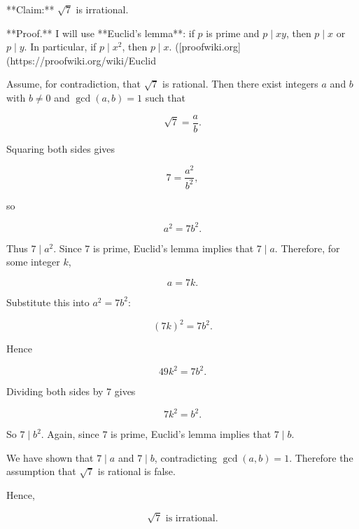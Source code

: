 **Claim:** $\sqrt{7}$ is irrational.

**Proof.** I will use **Euclid’s lemma**: if $p$ is prime and $p \mid xy$, then $p \mid x$ or $p \mid y$. In particular, if $p \mid x^2$, then $p \mid x$. ([proofwiki.org](https://proofwiki.org/wiki/Euclid%

Assume, for contradiction, that $\sqrt{7}$ is rational. Then there exist integers $a$ and $b$ with $b \neq 0$ and $\gcd(a,b)=1$ such that

\[
\sqrt{7}=\frac{a}{b}.
\]

Squaring both sides gives

\[
7=\frac{a^2}{b^2},
\]

so

\[
a^2=7b^2.
\]

Thus $7 \mid a^2$. Since $7$ is prime, Euclid’s lemma implies that $7 \mid a$. Therefore, for some integer $k$,

\[
a=7k.
\]

Substitute this into $a^2=7b^2$:

\[
(7k)^2=7b^2.
\]

Hence

\[
49k^2=7b^2.
\]

Dividing both sides by $7$ gives

\[
7k^2=b^2.
\]

So $7 \mid b^2$. Again, since $7$ is prime, Euclid’s lemma implies that $7 \mid b$.

We have shown that $7 \mid a$ and $7 \mid b$, contradicting $\gcd(a,b)=1$. Therefore the assumption that $\sqrt{7}$ is rational is false.

Hence,

\[
\boxed{\sqrt{7}\text{ is irrational}.}
\]